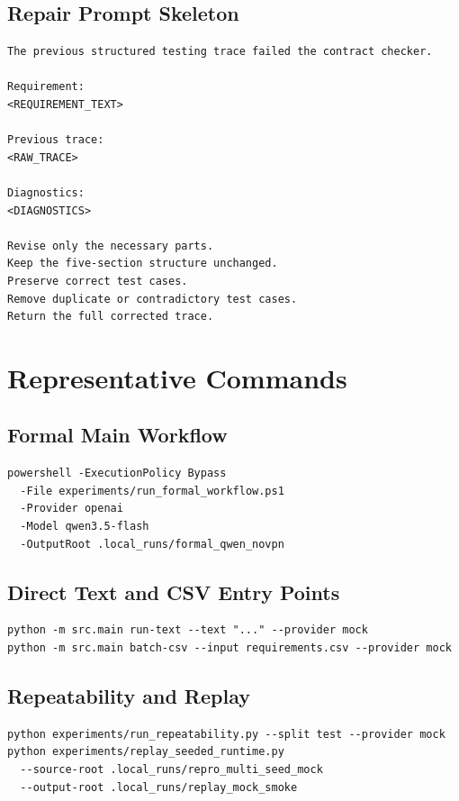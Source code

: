 \documentclass{article}
\begin{document}
\subsection{Repair Prompt Skeleton}
\begin{verbatim}
The previous structured testing trace failed the contract checker.

Requirement:
<REQUIREMENT_TEXT>

Previous trace:
<RAW_TRACE>

Diagnostics:
<DIAGNOSTICS>

Revise only the necessary parts.
Keep the five-section structure unchanged.
Preserve correct test cases.
Remove duplicate or contradictory test cases.
Return the full corrected trace.
\end{verbatim}

\section{Representative Commands}
\subsection{Formal Main Workflow}
\begin{verbatim}
powershell -ExecutionPolicy Bypass
  -File experiments/run_formal_workflow.ps1
  -Provider openai
  -Model qwen3.5-flash
  -OutputRoot .local_runs/formal_qwen_novpn
\end{verbatim}

\subsection{Direct Text and CSV Entry Points}
\begin{verbatim}
python -m src.main run-text --text "..." --provider mock
python -m src.main batch-csv --input requirements.csv --provider mock
\end{verbatim}

\subsection{Repeatability and Replay}
\begin{verbatim}
python experiments/run_repeatability.py --split test --provider mock
python experiments/replay_seeded_runtime.py
  --source-root .local_runs/repro_multi_seed_mock
  --output-root .local_runs/replay_mock_smoke
\end{verbatim}
\end{document}
